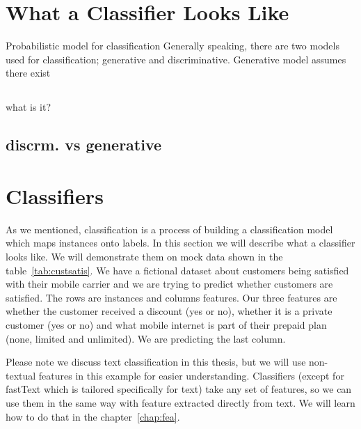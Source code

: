 \section{What a Classifier Looks Like}

Probabilistic model for classification
Generally speaking, there are two models used for classification; generative and discriminative. Generative model assumes there exist 

\subsection{}

what is it?

\subsection{discrm. vs generative}


\section{Classifiers}
\label{chap:clscon}

As we mentioned, classification is a process of building a classification model which maps
instances onto labels.
In this section we will describe what a classifier looks like.
We will demonstrate them on mock data shown in the table~\ref{tab:custsatis}.
We have a fictional dataset about customers being satisfied with their mobile carrier and
we are trying to predict whether customers are satisfied.
The rows are instances and columns features.
Our three features are 
whether the customer received a discount (yes or no), whether it is a private customer (yes or no)
and what mobile internet is part of their prepaid plan (none, limited and unlimited).
We are predicting the last column.

Please note we discuss text classification in this thesis, but
we will use non-textual features in this example for easier understanding.
Classifiers (except for fastText which is tailored specifically for text) take any set of features,
so we can use them in the same way with feature extracted directly from text.
We will learn how to do that in the chapter~\ref{chap:fea}.


